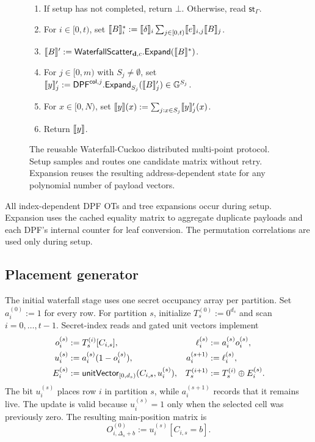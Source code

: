 \begin{figure}[H]
{\begin{minipage}{.95\textwidth}
\begin{enumerate}[nosep]
  \item If setup has not completed, return $\bot$.  Otherwise, read
  $\mathsf{st}_\Gamma$.
  \item For $i\in[0,t)$, set
  $\share B_i^*:=\share\delta_i
  \sum_{j\in[0,t)}\share e_{i,j}\share B_j$.
  \item $\share B':=
  \mathsf{WaterfallScatter}_{\mathbf d,c}.\mathsf{Expand}(\share B^*)$.
  \item For $j\in[0,m)$ with $S_j\neq\emptyset$, set
  $\share y'_j:=
  \mathsf{DPF}^{\mathsf{col},j}.\mathsf{Expand}_{S_j}(\share B'_j)
  \in\mathbb G^{S_j}$.
  \item For $x\in[0,N)$, set
  $\share y(x):=\sum_{j:x\in S_j}\share y'_j(x)$.
  \item Return $\share y$.
\end{enumerate}
\end{minipage}}
\caption{The reusable Waterfall-Cuckoo distributed multi-point protocol.
Setup samples and routes one candidate matrix without retry.  Expansion reuses
the resulting address-dependent state for any polynomial number of payload
vectors.\label{fig:waterfallCuckoo}}
\end{figure}

All index-dependent DPF OTs and tree expansions occur during setup.
Expansion uses the cached equality matrix to aggregate duplicate payloads
and each DPF's internal counter for leaf conversion. The permutation
correlations are used only during setup.

\subsection{Placement generator}\label{sec:waterfallRoute}

The initial waterfall stage uses one secret occupancy array per partition.
Set $a_i^{(0)}:=1$ for every row.  For partition $s$, initialize
$T_s^{(0)}:=0^{d_s}$ and scan $i=0,\ldots,t-1$.  Secret-index reads and gated
unit vectors implement
\begin{align}
 o_i^{(s)}&:=T_s^{(i)}[C_{i,s}],
 &\ell_i^{(s)}&:=a_i^{(s)}o_i^{(s)},\nonumber\\
 u_i^{(s)}&:=a_i^{(s)}(1-o_i^{(s)}),
 &a_i^{(s+1)}&:=\ell_i^{(s)},\label{eq:waterfall-state-transition}\\
 E_i^{(s)}&:=\mathsf{unitVector}_{[0,d_s)}(C_{i,s},u_i^{(s)}),
 &T_s^{(i+1)}&:=T_s^{(i)}\oplus E_i^{(s)}.\nonumber
\end{align}
The bit $u_i^{(s)}$ places row $i$ in partition $s$, while
$a_i^{(s+1)}$ records that it remains live.  The update is valid because
$u_i^{(s)}=1$ only when the selected cell was previously zero.  The resulting
main-position matrix is
\begin{equation}\label{eq:waterfall-main-owner}
 O^{(0)}_{i,\Delta_s+b}:=
 u_i^{(s)}[C_{i,s}=b].
\end{equation}

